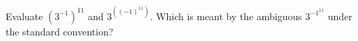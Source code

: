Evaluate $\left(3^{-1}\right)^{11}$ and $3^{\left((-1)^{11}\right)}$. Which is meant by the ambiguous $3^{-1^{11}}$ under the standard convention?
